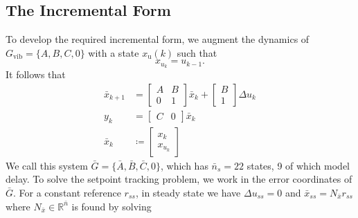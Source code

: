 \documentclass[twocolumn,twoside]{IEEEtran}
\newcommand{\du}{\ensuremath{\Delta u }\xspace}
\newcommand{\Gd}{\ensuremath{\bar G }\xspace}
\newcommand{\Ad}{\ensuremath{\bar A }\xspace}
\newcommand{\Bd}{\ensuremath{\bar B }\xspace}
\newcommand{\Cd}{\ensuremath{\bar C }\xspace}
\newcommand{\xd}{\ensuremath{\bar x }\xspace}
\newcommand{\x}{\ensuremath{x }\xspace}
\newcommand{\xdss}{\ensuremath{\bar x_{ss} }\xspace}
\newcommand{\y}{\ensuremath{y} \xspace}
\newcommand{\Gv}{\ensuremath{G_{\text{vib}}}\xspace}
\begin{document}
\subsection{The Incremental Form}\label{sec:incremental}
To develop the required incremental form, we augment the dynamics of \(\Gv=\{A,B,C,0\}\) with a state \(\x_{\text{u}}(k)\) such that
\begin{equation*}
  \x_{u_k} = u_{k-1}.
\end{equation*}
It follows that
\begin{subequations}
\begin{align}
  \xd_{k+1}
  &=
    \begin{bmatrix}
      A & B\\ 0 & 1
    \end{bmatrix}
                  \xd_k
    +
    \begin{bmatrix}
      B\\1
    \end{bmatrix}
  \Delta u_k \label{eqn:deltadyn} \\
  \y_k & = \begin{bmatrix}C & 0\end{bmatrix}\xd_k\\
    \xd_k& \coloneqq
    \begin{bmatrix}\x_k\\\x_{u_k} \end{bmatrix}
\end{align}\label{eqn:ssdelta}%
\end{subequations}
We call this system \(\Gd = \{\Ad, \Bd, \Cd, 0\}\), which has \({\bar{n}_s=22}\) states, 9 of which model delay.
To solve the setpoint tracking problem, we work in the error
coordinates of \(\Gd\).
For a constant reference \(r_{ss}\), in steady state we have \({\du_{ss}=0}\) and \({\xdss =N_{\xd}r_{ss}}\) where \({N_{\xd}\in\mathds{R}^{\bar{n}}}\) is found by solving
\end{document}
